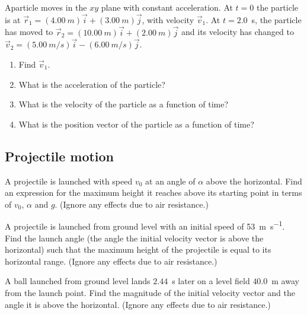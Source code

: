 \begin{problem}
	Aparticle moves in the $xy$ plane with constant acceleration.
	At $t = 0$ the particle is at $\vec r_1 = (4.00~m) \vec i + (3.00~m) \vec j$, with velocity $\vec v_1$.
	At $t = 2.0$~s, the particle has moved to $\vec r_2 = (10.00~m) \vec i + (2.00~m) \vec j$ and
	its velocity has changed to $\vec v_2 = (5.00~m/s) \vec i - (6.00~m/s) \vec j$. 
	\begin{enumerate}[label = (\alph*)]
		\item Find $\vec v_1$.
		\item What is the acceleration of the particle?
		\item What is the velocity of the particle as a function of time?
		\item  What is the position vector of the particle as a function of time?
	\end{enumerate}
\end{problem}


\subsection{Projectile motion}

\begin{problem}
	A projectile is launched with speed $v_0$ at an angle of $\alpha$
	above the horizontal. Find an expression for the maximum height it
	reaches above its starting point in terms of $v_0$, $\alpha$ and $g$. (Ignore any
	effects due to air resistance.)
\end{problem}


\begin{problem}
	A projectile is launched from ground level with an initial
	speed of 53~\si{\meter\per\second}. Find the launch angle (the angle the initial velocity vector is above the horizontal) such that the maximum height of
	the projectile is equal to its horizontal range. (Ignore any effects due
	to air resistance.)
\end{problem}


\begin{problem}
	A ball launched from ground level lands $2.44$~s later on a
	level field $40.0$~m away from the launch point. Find the magnitude
	of the initial velocity vector and the angle it is above the horizontal.
	(Ignore any effects due to air resistance.)
\end{problem}


